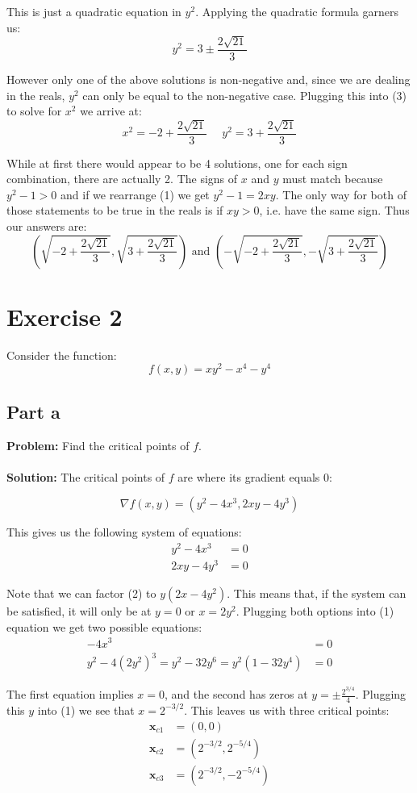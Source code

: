 \documentclass{article}
\begin{document}
This is just a quadratic equation in $y^2$. Applying the quadratic formula garners us:
$$y^2=3\pm\frac{2\sqrt{21}}{3}$$

However only one of the above solutions is non-negative and, since we are dealing in the reals, $y^2$ can only be equal to the non-negative case. Plugging this into (3) to solve for $x^2$ we arrive at:
$$x^2=-2+\frac{2\sqrt{21}}{3}\ \ \ \ \ \  y^2=3+\frac{2\sqrt{21}}{3}$$

While at first there would appear to be 4 solutions, one for each sign combination, there are actually 2. The signs of $x$ and $y$ must match because $y^2-1>0$ and if we rearrange (1) we get $y^2-1=2xy$. The only way for both of those statements to be true in the reals is if $xy>0$, i.e. have the same sign. Thus our answers are:
$$\left(\sqrt{-2+\frac{2\sqrt{21}}{3}},\sqrt{3+\frac{2\sqrt{21}}{3}}\right)\text{ and   } \left(-\sqrt{-2+\frac{2\sqrt{21}}{3}},-\sqrt{3+\frac{2\sqrt{21}}{3}}\right)$$

\section*{Exercise 2}
Consider the function:
$$f(x,y)=xy^2-x^4-y^4$$

\subsection*{Part a}
\setcounter{equation}{0}
\textbf{Problem:} Find the critical points of $f$.
\\\\
\textbf{Solution:} The critical points of $f$ are where its gradient equals 0:

$$\nabla f(x,y)=(y^2-4x^3,2xy-4y^3)$$

This gives us the following system of equations:
\begin{align}
y^2-4x^3&=0\\
2xy-4y^3&=0
\end{align}

Note that we can factor (2) to $y(2x-4y^2)$. This means that, if the system can be satisfied, it will only be at $y=0$ or $x=2y^2$. Plugging both options into (1) equation we get two possible equations:
\begin{align*}
-4x^3&=0\\
y^2-4(2y^2)^3=y^2-32y^6=y^2(1-32y^4)&=0
\end{align*}

The first equation implies $x=0$, and the second has zeros at $y=\pm\frac{2^{3/4}}{4}$. Plugging this $y$ into (1) we see that $x=2^{-3/2}$. This leaves us with three critical points:
\begin{align*}
  \mathbf x_{c1}&=(0,0)\\
  \mathbf x_{c2}&=(2^{-3/2},2^{-5/4})\\
  \mathbf x_{c3}&=(2^{-3/2},-2^{-5/4})
\end{align*}
\end{document}
